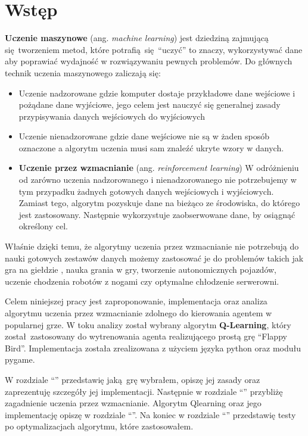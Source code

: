 \documentclass[a4paper, 12pt,oneside]{book}
\newcommand\chap[1]{%
  \chapter*{#1}%
  \addcontentsline{toc}{chapter}{#1}}
\begin{document}
\sloppy
\thispagestyle{empty}

\newpage{}

\thispagestyle{empty}
\newpage{}

\tableofcontents{}
\newpage


\chap{Wstęp}
\textbf{Uczenie maszynowe} (ang. \textit{machine learning}) jest dziedziną
zajmującą się tworzeniem metod, które potrafią się ``uczyć'' to znaczy,
wykorzystywać dane aby poprawiać wydajność w rozwiązywaniu pewnych
problemów\cite{machine_learning_definition}.
Do głównych technik uczenia maszynowego zaliczają się:
\begin{itemize}
	\setlength\itemsep{-0.4em}
\item Uczenie nadzorowane gdzie komputer dostaje przykładowe dane wejściowe i
	pożądane dane wyjściowe, jego celem jest nauczyć się generalnej zasady
	przypisywania danych wejściowych do wyjściowych
\item Uczenie nienadzorowane gdzie dane wejściowe nie są w żaden sposób
	oznaczone a algorytm uczenia musi sam znaleźć ukryte wzory w danych.
\item \textbf{Uczenie przez wzmacnianie}
	(ang. \textit{reinforcement learning}) W odróżnieniu od zarówno uczenia 
	nadzorowanego i nienadzorowanego nie potrzebujemy w tym przypadku
	żadnych	gotowych danych wejściowych i wyjściowych. Zamiast tego,
	algorytm pozyskuje dane na bieżąco ze środowiska, do którego jest
	zastosowany. Następnie wykorzystuje zaobserwowane dane, by osiągnąć
	określony cel.
\end{itemize}

Właśnie dzięki temu, że algorytmy uczenia przez wzmacnianie nie potrzebują do
nauki gotowych
zestawów danych możemy zastosować je do problemów takich jak gra na giełdzie
\cite{trading_reinforcement}, nauka grania w gry, tworzenie autonomicznych
pojazdów, uczenie chodzenia robotów z nogami czy optymalne chłodzenie
serwerowni\cite{reinforcement_applications}.

Celem niniejszej pracy jest zaproponowanie, implementacja oraz analiza
algorytmu uczenia przez wzmacnianie zdolnego do kierowania agentem w popularnej
grze. W toku analizy został wybrany algorytm \textbf{Q-Learning}, który
został zastosowany do wytrenowania agenta realizującego prostą grę ``Flappy
Bird''. Implementacja została zrealizowana z użyciem języka python oraz modułu
pygame.

W rozdziale ``'' przedstawię jaką grę wybrałem, opiszę jej
zasady oraz zaprezentuję szczegóły jej implementacji. Następnie w rozdziale
``'' przybliżę zagadnienie uczenia przez
wzmacnianie. Algorytm Q\dywiz learning oraz jego implementację opiszę w
rozdziale ``''. Na koniec w rozdziale
``'' przedstawię testy po optymalizacjach algorytmu,
które zastosowałem.
\newpage{}
\end{document}
